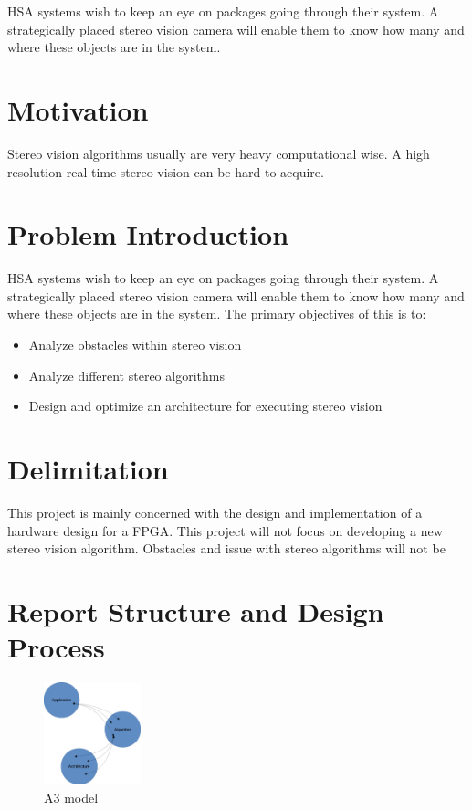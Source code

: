 HSA systems wish to keep an eye on packages going through their system. A strategically placed stereo vision camera will enable them to know how many and where these objects are in the system. 

\section{Motivation}
Stereo vision algorithms usually are very heavy computational wise. A high resolution real-time stereo vision can be hard to acquire. 

\section{Problem Introduction}
HSA systems wish to keep an eye on packages going through their system. A strategically placed stereo vision camera will enable them to know how many and where these objects are in the system. 
The primary objectives of this is to:
\begin{itemize}
  \item Analyze obstacles within stereo vision
  \item Analyze different stereo algorithms
  \item Design and optimize an architecture for executing stereo vision 
\end{itemize}


\section{Delimitation}
This project is mainly concerned with the design and implementation of a hardware design for a FPGA. This project will not focus on developing a new stereo vision algorithm. Obstacles and issue with stereo algorithms will not be 


\section{Report Structure and Design Process}

\begin{figure}[ht!]
  \centering
  \includegraphics[width=0.25\textwidth]{figures/A3model.jpg}
  \caption{A3 model}
  \label{fig:A3 model}
\end{figure}

